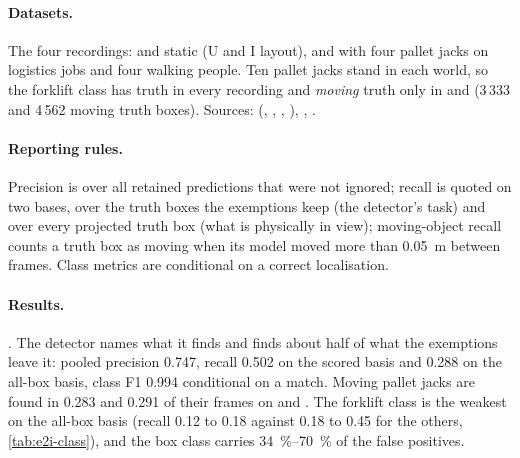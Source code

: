 \documentclass[11pt,a4paper,notitlepage]{report}
\begin{document}
\paragraph{Datasets.} The four  recordings:
 and  static (U and I layout),  and 
with four pallet jacks on logistics jobs and four walking people. Ten pallet
jacks stand in each world, so the forklift class has truth in every recording
and \emph{moving} truth only in  and  (3\,333 and 4\,562
moving truth boxes). Sources: 
(, , ,
), ,
.

\paragraph{Reporting rules.} Precision is over all retained predictions that
were not ignored; recall is quoted on two bases, over the truth boxes the
exemptions keep (the detector's task) and over every projected truth box
(what is physically in view); moving-object recall counts a truth box as
moving when its model moved more than \SI{0.05}{\metre} between frames.
Class metrics are conditional on a correct localisation.

\paragraph{Results.} . The detector names what it
finds and finds about half of what the exemptions leave it: pooled
precision 0.747, recall 0.502 on the scored basis and 0.288 on the all-box
basis, class F1 0.994 conditional on a match. Moving pallet jacks are found
in 0.283 and 0.291 of their frames on  and . The forklift
class is the weakest on the all-box basis (recall 0.12 to 0.18 against 0.18
to 0.45 for the others, \cref{tab:e2i-class}), and the box class carries
\SIrange{34}{70}{\percent} of the false positives.
\end{document}
